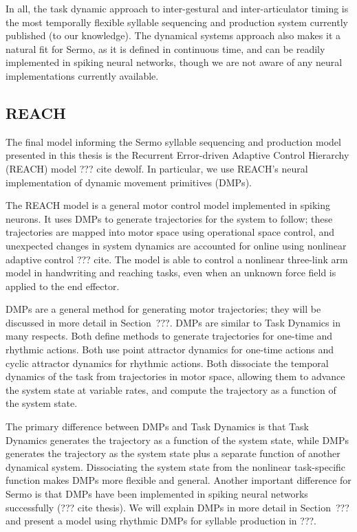 In all, the task dynamic approach
to inter-gestural and inter-articulator timing
is the most temporally flexible
syllable sequencing and production system
currently published
(to our knowledge).
The dynamical systems approach
also makes it a natural fit for Sermo,
as it is defined in continuous time,
and can be readily implemented
in spiking neural networks,
though we are not aware of any
neural implementations currently available.

\subsection{REACH}

The final model informing
the Sermo syllable sequencing
and production model presented
in this thesis is the
Recurrent Error-driven Adaptive Control Hierarchy (REACH)
model ??? cite dewolf.
In particular, we use REACH's
neural implementation
of dynamic movement primitives (DMPs).

The REACH model is a general motor control
model implemented in spiking neurons.
It uses DMPs to generate trajectories
for the system to follow;
these trajectories are mapped into
motor space using operational space control,
and unexpected changes in system dynamics
are accounted for online
using nonlinear adaptive control
??? cite.
The model is able to control
a nonlinear three-link arm model
in handwriting and reaching tasks,
even when an unknown force field
is applied to the end effector.

DMPs are a general method for generating motor trajectories;
they will be discussed in more detail
in Section~???.
DMPs are similar to Task Dynamics in many respects.
Both define methods to generate trajectories
for one-time and rhythmic actions.
Both use point attractor dynamics
for one-time actions
and cyclic attractor dynamics
for rhythmic actions.
Both dissociate the temporal dynamics
of the task from trajectories
in motor space,
allowing them to advance the system state
at variable rates,
and compute the trajectory
as a function of the system state.

The primary difference between DMPs and Task Dynamics
is that Task Dynamics generates
the trajectory as a function
of the system state,
while DMPs generates the trajectory
as the system state
plus a separate function
of another dynamical system.
Dissociating the system state
from the nonlinear task-specific function
makes DMPs more flexible and general.
Another important difference for Sermo
is that DMPs have been implemented
in spiking neural networks successfully
(??? cite thesis).
We will explain DMPs in more detail
in Section~??? and present a model
using rhythmic DMPs for syllable production
in ???.

